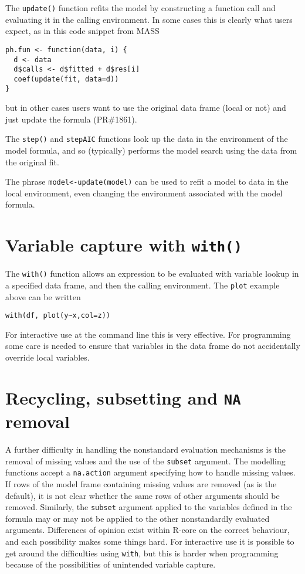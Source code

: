 \documentclass[11pt]{article}
\begin{document}
The \texttt{update()} function refits the model by constructing a
function call and evaluating it in the calling environment.  In some cases this is clearly what users expect, as in this code snippet from MASS
\begin{verbatim}
ph.fun <- function(data, i) {
  d <- data
  d$calls <- d$fitted + d$res[i]
  coef(update(fit, data=d))
}
\end{verbatim}
but in other cases users want to use the original data frame (local or not) and just update the formula (PR\#1861).

The \texttt{step()} and \texttt{stepAIC} functions look up the data in
the environment of the model formula, and so (typically) performs the
model search using the data from the original fit.


The phrase \texttt{model<-update(model)} can be used to refit a model
to data in the local environment, even changing the environment associated with the model formula.

\section{Variable capture with \texttt{with()}}
The \verb=with()= function allows an expression to be evaluated with variable lookup in a specified data frame,  and then the calling environment. The \texttt{plot} example above can be written
\begin{verbatim}
with(df, plot(y~x,col=z))
\end{verbatim}
For interactive use at the command line this is very effective.  For programming some care is needed to ensure that variables in the data frame do not accidentally override local variables.

\section{Recycling, subsetting and \texttt{NA} removal}
A further difficulty in handling the nonstandard evaluation mechanisms is the removal of missing values and the use of the \texttt{subset} argument.  The modelling functions accept a \texttt{na.action} argument specifying how to handle missing values. If rows of the model frame containing missing values are removed (as is the default), it is not clear whether the same rows of other arguments should be removed.  Similarly, the \texttt{subset} argument applied to the variables defined in the formula may or may not be applied to the other nonstandardly evaluated arguments.  Differences of opinion exist within R-core on the correct behaviour, and each possibility makes some things hard.   For interactive use it is possible to get around the difficulties using \texttt{with}, but this is harder when programming because of the possibilities of unintended variable capture.
\end{document}
